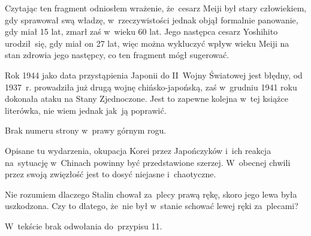 \documentclass[a4paper,11pt]{article}
\begin{document}
\vspace{\spaceFour}



\start {} Czytając ten fragment odniosłem wrażenie, że~cesarz
Meiji był stary człowiekiem, gdy sprawował swą władzę,
w~rzeczywistości jednak objął formalnie panowanie, gdy miał 15 lat,
zmarł zaś w~wieku 60 lat. Jego następca cesarz Yoshihito urodził~się,
gdy miał on 27 lat, więc można wykluczyć wpływ wieku Meiji na stan
zdrowia jego następcy, co ten fragment mógł sugerować.

\vspace{\spaceFour}



\start {}

\vspace{\spaceFour}



\start {} Rok 1944 jako data przystąpienia Japonii do II~Wojny
Światowej jest błędny, od 1937~r. prowadziła już drugą wojnę
chińsko-japońską, zaś w~grudniu 1941 roku dokonała ataku na Stany
Zjednoczone. Jest to zapewne kolejna w~tej książce literówka, nie wiem
jednak jak~ją poprawić.

\vspace{\spaceFour}



\start {} Brak numeru strony w~prawy górnym rogu.

\vspace{\spaceFour}



\start {} Opisane tu wydarzenia, okupacja Korei przez
Japończyków i~ich reakcja na~sytuację w~Chinach powinny być
przedstawione szerzej. W~obecnej chwili przez swoją zwięzłość jest to
dosyć niejasne i~chaotyczne.

\vspace{\spaceFour}



\start {} Nie rozumiem dlaczego Stalin chował za~plecy prawą
rękę, skoro jego lewa była uszkodzona. Czy to dlatego, że~nie był
w~stanie schować lewej ręki za~plecami?

\vspace{\spaceFour}



\start {} W~tekście brak odwołania do~przypisu 11.

\vspace{\spaceFour}
\end{document}

